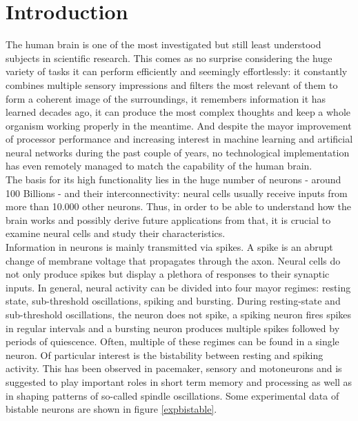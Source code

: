 \documentclass[12pt,a4paper]{article}
\begin{document}

 

\maketitle

\thispagestyle{empty}
\newpage

\tableofcontents
\thispagestyle{empty}
\newpage
{}

\section{Introduction}

The human brain is one of the most investigated but still least understood subjects in scientific research. This comes as no surprise considering the huge variety of tasks it can perform efficiently and seemingly effortlessly: it constantly combines multiple sensory impressions and filters the most relevant of them to form a coherent image of the surroundings, it remembers information it has learned decades ago, it can produce the most complex thoughts and keep a whole organism working properly in the meantime. And despite the mayor improvement of processor performance and increasing interest in machine learning and artificial neural networks during the past couple of years, no technological implementation has even remotely managed to match the capability of the human brain.\\
The basis for its high functionality lies in the huge number of neurons - around 100 Billions\cite{eqnum} - and their interconnectivity: neural cells usually receive inputs from more than 10.000 other neurons\cite{izi}. Thus, in order to be able to understand how the brain works and possibly derive future applications from that, it is crucial to examine neural cells and study their characteristics. \\
Information in neurons is mainly transmitted via spikes. A spike is an abrupt change of membrane voltage that propagates through the axon. Neural cells do not only produce spikes but display a plethora of responses to their synaptic inputs. In general, neural activity can be divided into four mayor regimes: resting state, sub-threshold oscillations, spiking and bursting\cite{dnb}. During resting-state and sub-threshold oscillations, the neuron does not spike, a spiking neuron fires spikes in regular intervals and a bursting neuron produces multiple spikes followed by periods of quiescence. Often, multiple of these regimes can be found in a single neuron. Of particular interest is the bistability between resting and spiking activity. This has been observed in pacemaker\cite{pacemaker}, sensory \cite{sensory}\cite{sensorystm1} and motoneurons\cite{moto1}\cite{moto2} and is suggested to play important roles in short term memory and processing\cite{sensorystm1}\cite{stm1}\cite{stm2} as well as in shaping patterns of so-called spindle oscillations\cite{spindle}. Some experimental data of bistable neurons are shown in figure \ref{expbistable}.
\end{document}

